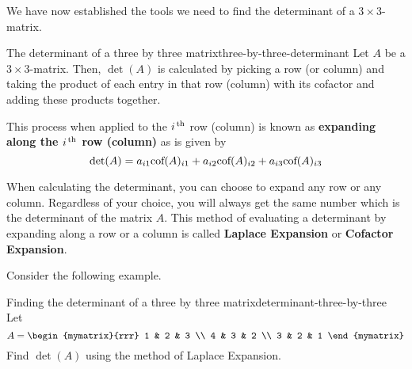 We have now established the tools we need to find the determinant of a
$3\times3$-matrix.

\begin{definition}{The determinant of a three by three matrix}{three-by-three-determinant}
  Let $A$ be a $3\times 3$-matrix. Then, $\det(A)$ is calculated by
  picking a row (or column) and taking the product of each entry in
  that row (column) with its cofactor and adding these products
  together.

  This process when applied to the $i^{\,\rm th}$ row (column) is known as
  \textbf{expanding along the $i^{\,\rm th}$ row (column)}%
   as is given by
  \[
    \det(A) =
    a_{i1}\mbox{\rm cof}(A)_{i1} + a_{i2}\mbox{\rm cof}(A)_{i2} + a_{i3}\mbox{\rm cof}(A)_{i3}
  \]
\end{definition}

When calculating the determinant, you can choose to expand any row or
any column. Regardless of your choice, you will always get the same
number which is the determinant of the matrix $A$.  This method of
evaluating a determinant by expanding along a row or a column is
called \textbf{Laplace Expansion} or
\textbf{Cofactor Expansion}.

Consider the following example.

\begin{example}{Finding the determinant of a three by three matrix}{determinant-three-by-three}
  Let
  \begin{equation*}
    A=\begin{mymatrix}{rrr}
      1 & 2 & 3 \\
      4 & 3 & 2 \\
      3 & 2 & 1
    \end{mymatrix} 
  \end{equation*}
  Find $\det(A)$ using the method of Laplace Expansion.
\end{example}

